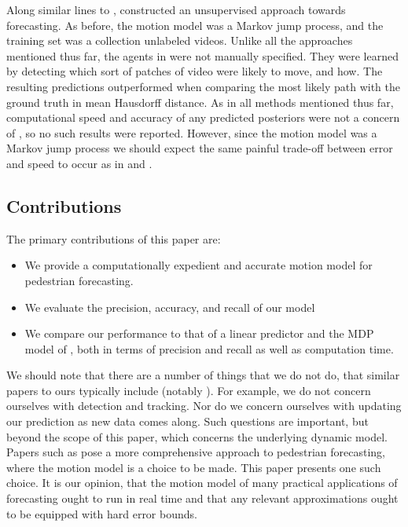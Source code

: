 \documentclass[conference]{IEEEtran}
\begin{document}
Along similar lines to \cite{Ballan2016}, \citet{Walker2014} constructed an unsupervised approach towards forecasting.
As before, the motion model was a Markov jump process, and the training set was a collection unlabeled videos.
Unlike all the approaches mentioned thus far, the agents in \cite{Walker2014} were not manually specified.
They were learned by detecting which sort of patches of video were likely to move, and how.
The resulting predictions outperformed \cite{Kitani2012} when comparing the most likely path with the ground truth in mean Hausdorff distance.
As in all methods mentioned thus far, computational speed and accuracy of any predicted posteriors were not a concern of \citet{Walker2014}, so no such results were reported.
However, since the motion model was a Markov jump process we should expect the same painful trade-off between error and speed to occur as in \cite{Karasev2016} and \cite{Ballan2016}.

\subsection{Contributions}

The primary contributions of this paper are:
\begin{itemize}
	\item We provide a computationally expedient and accurate motion model for pedestrian forecasting.
	\item We evaluate the precision, accuracy, and recall of our model
	\item We compare our performance to that of a linear predictor and the MDP model of \cite{Kitani2012},
	both in terms of precision and recall as well as computation time.
\end{itemize}

We should note that there are a number of things that we do not do, that similar papers to ours typically include (notably \cite{Ballan2016,Karasev2016}).
For example, we do not concern ourselves with detection and tracking. Nor do we concern ourselves with updating our prediction as new data comes along.
Such questions are important, but beyond the scope of this paper, which concerns the underlying dynamic model.
Papers such as \cite{Ballan2016,Karasev2016} pose a more comprehensive approach to pedestrian forecasting, where the motion model is a choice to be made.
This paper presents one such choice.
It is our opinion, that the motion model of many practical applications of forecasting ought to run in real time and that any relevant approximations ought to be equipped with hard error bounds.
\end{document}
